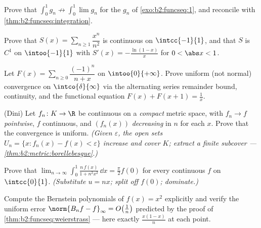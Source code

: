 \begin{exercise}[$\star$]\label{exo:b2:funcseq:2}
Prove that $\displaystyle\int_0^1 g_n \not\to \int_0^1 \lim g_n$
for the $g_n$ of \cref{exo:b2:funcseq:1}, and reconcile with
\cref{thm:b2:funcseq:integration}.
\end{exercise}

\begin{exercise}[$\star$]\label{exo:b2:funcseq:3}
Prove that $S(x) = \sum_{n\geq1} \dfrac{x^n}{n^2}$ is continuous on
$\intcc{-1}{1}$, and that $S$ is $C^1$ on $\intoo{-1}{1}$ with
$S'(x) = -\frac{\ln(1-x)}{x}$ for $0 < \abs x < 1$.
\end{exercise}

\begin{exercise}[$\star\star$]\label{exo:b2:funcseq:4}
Let $F(x) = \sum_{n \geq 0} \dfrac{(-1)^n}{n + x}$ on
$\intoo{0}{+\infty}$. Prove uniform (not normal) convergence on
$\intco{\delta}{\infty}$ via the alternating series remainder
bound, continuity, and the functional equation $F(x) + F(x + 1) =
\frac1x$.
\end{exercise}

\begin{exercise}[$\star\star$]\label{exo:b2:funcseq:5}
(Dini) Let $f_n \colon K \to \R$ be continuous on a \emph{compact}
metric space, with $f_n \to f$ \emph{pointwise}, $f$ continuous,
and $(f_n(x))$ \emph{decreasing} in $n$ for each $x$. Prove that
the convergence is uniform. \emph{(Given $\varepsilon$, the open
sets $U_n = \{x : f_n(x) - f(x) < \varepsilon\}$ increase and cover
$K$; extract a finite subcover ---
\cref{thm:b2:metric:borellebesgue}.)}
\end{exercise}

\begin{exercise}[$\star\star$]\label{exo:b2:funcseq:6}
Prove that $\displaystyle\lim_{n\to\infty} \int_0^1
\frac{n\,f(x)}{1 + n^2x^2}\,\dd x = \frac{\pi}{2} f(0)$ for every
continuous $f$ on $\intcc{0}{1}$. \emph{(Substitute $u = nx$; split
off $f(0)$; dominate.)}
\end{exercise}

\begin{exercise}[$\star\star$]\label{exo:b2:funcseq:7}
Compute the Bernstein polynomials of $f(x) = x^2$ explicitly and
verify the uniform error $\norm{B_n f - f}_\infty =
O\bigl(\frac1n\bigr)$ predicted by the proof of
\cref{thm:b2:funcseq:weierstrass} --- here exactly $\frac{x(1 -
x)}{n}$ at each point.
\end{exercise}

